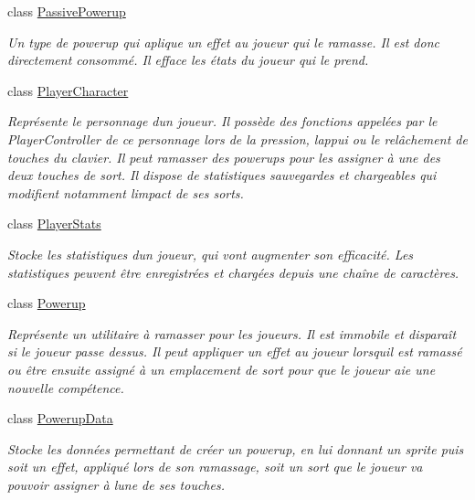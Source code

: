 \begin{DoxyCompactItemize}
class \hyperlink{class_tentacle_slicers_1_1actors_1_1_passive_powerup}{Passive\+Powerup}
\begin{DoxyCompactList}\small\item\em Un type de powerup qui aplique un effet au joueur qui le ramasse. Il est donc directement consommé. Il efface les états du joueur qui le prend. \end{DoxyCompactList}\item 
class \hyperlink{class_tentacle_slicers_1_1actors_1_1_player_character}{Player\+Character}
\begin{DoxyCompactList}\small\item\em Représente le personnage d\textquotesingle{}un joueur. Il possède des fonctions appelées par le Player\+Controller de ce personnage lors de la pression, l\textquotesingle{}appui ou le relâchement de touches du clavier. Il peut ramasser des powerups pour les assigner à une des deux touches de sort. Il dispose de statistiques sauvegardes et chargeables qui modifient notamment l\textquotesingle{}impact de ses sorts. \end{DoxyCompactList}\item 
class \hyperlink{class_tentacle_slicers_1_1actors_1_1_player_stats}{Player\+Stats}
\begin{DoxyCompactList}\small\item\em Stocke les statistiques d\textquotesingle{}un joueur, qui vont augmenter son efficacité. Les statistiques peuvent être enregistrées et chargées depuis une chaîne de caractères. \end{DoxyCompactList}\item 
class \hyperlink{class_tentacle_slicers_1_1actors_1_1_powerup}{Powerup}
\begin{DoxyCompactList}\small\item\em Représente un utilitaire à ramasser pour les joueurs. Il est immobile et disparaît si le joueur passe dessus. Il peut appliquer un effet au joueur lorsqu\textquotesingle{}il est ramassé ou être ensuite assigné à un emplacement de sort pour que le joueur aie une nouvelle compétence. \end{DoxyCompactList}\item 
class \hyperlink{class_tentacle_slicers_1_1actors_1_1_powerup_data}{Powerup\+Data}
\begin{DoxyCompactList}\small\item\em Stocke les données permettant de créer un powerup, en lui donnant un sprite puis soit un effet, appliqué lors de son ramassage, soit un sort que le joueur va pouvoir assigner à l\textquotesingle{}une de ses touches. \end{DoxyCompactList}\item 

\end{DoxyCompactItemize}
